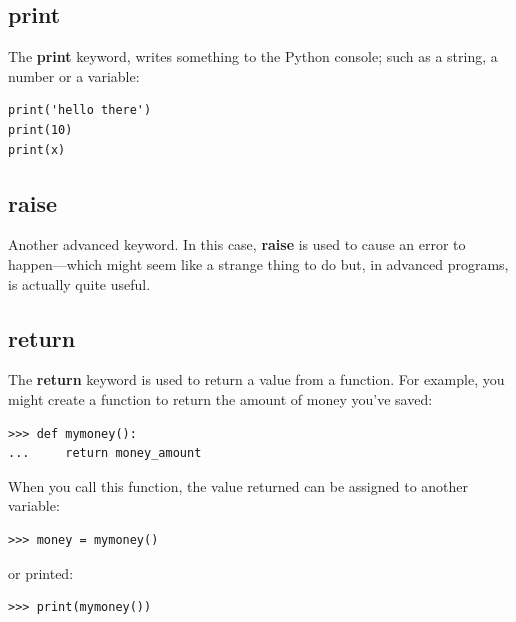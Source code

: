 \subsection*{print}

The \textbf{print} keyword, writes something to the Python console; such as a string, a number or a variable:

\begin{listing}
\begin{verbatim}
print('hello there')
print(10)
print(x)
\end{verbatim}
\end{listing}

\subsection*{raise}

Another advanced keyword.  In this case, \textbf{raise} is used to cause an error to happen---which might seem like a strange thing to do but, in advanced programs, is actually quite useful.

\subsection*{return}

The \textbf{return} keyword is used to return a value from a function.  For example, you might create a function to return the amount of money you've saved:

\begin{listingignore}
\begin{verbatim}
>>> def mymoney():
...     return money_amount
\end{verbatim}
\end{listingignore}

\noindent
When you call this function, the value returned can be assigned to another variable:

\begin{listingignore}
\begin{verbatim}
>>> money = mymoney()
\end{verbatim}
\end{listingignore}

\noindent
or printed:

\begin{listingignore}
\begin{verbatim}
>>> print(mymoney())
\end{verbatim}
\end{listingignore}

